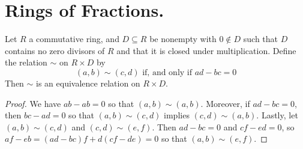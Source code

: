 \section{Rings of Fractions.}

\begin{lemma}\label{1.5.1}
    Let $R$ a commutative ring, and  $D \subseteq R$ be nonempty with $0 \notin
    D$ such that $D$ contains no zero divisors of $R$ and that it is closed
    under multiplication. Define the relation $\sim$ on  $R \times D$ by
    \begin{equation*}
        (a,b) \sim (c,d) \text{ if, and only if } ad-bc=0
    \end{equation*}
    Then $\sim$ is an equivalence relation on  $R \times D$.
\end{lemma}
\begin{proof}
    We have $ab-ab=0$ so that  $(a,b) \sim (a,b)$. Moreover, if $ad-bc=0$, then
     $bc-ad=0$ so that  $(a,b) \sim (c,d)$ implies $(c,d) \sim (a,b)$. Lastly,
     let $(a,b) \sim (c,d)$ and $(c,d) \sim (e,f)$. Then $ad-bc=0$ and
     $cf-ed=0$, so $af-eb=(ad-bc)f+d(cf-de)=0$ so that $(a,b) \sim (e,f)$.
\end{proof}

